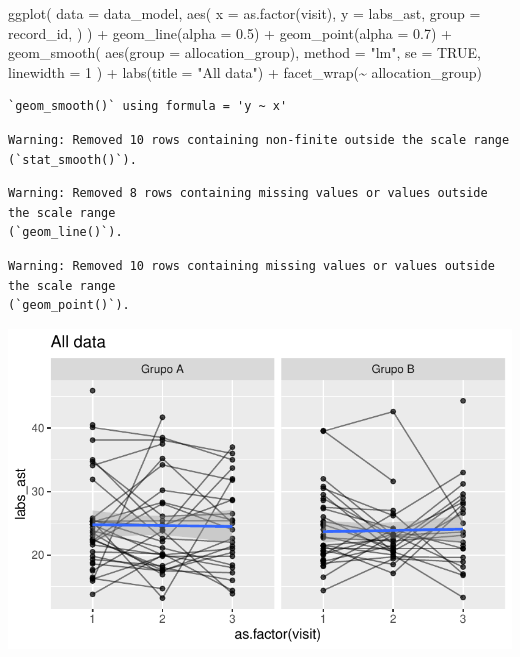 \documentclass[
  letterpaper,
  DIV=11,
  numbers=noendperiod]{scrartcl}
\newenvironment{Shaded}{\begin{snugshade}}{\end{snugshade}}
\newcommand{\AttributeTok}[1]{\textcolor[rgb]{0.40,0.45,0.13}{#1}}
\newcommand{\ConstantTok}[1]{\textcolor[rgb]{0.56,0.35,0.01}{#1}}
\newcommand{\DecValTok}[1]{\textcolor[rgb]{0.68,0.00,0.00}{#1}}
\newcommand{\FloatTok}[1]{\textcolor[rgb]{0.68,0.00,0.00}{#1}}
\newcommand{\FunctionTok}[1]{\textcolor[rgb]{0.28,0.35,0.67}{#1}}
\newcommand{\NormalTok}[1]{\textcolor[rgb]{0.00,0.23,0.31}{#1}}
\newcommand{\SpecialCharTok}[1]{\textcolor[rgb]{0.37,0.37,0.37}{#1}}
\newcommand{\StringTok}[1]{\textcolor[rgb]{0.13,0.47,0.30}{#1}}
\begin{document}
\begin{Shaded}
\begin{Highlighting}[]
\FunctionTok{ggplot}\NormalTok{(}
    \AttributeTok{data =}\NormalTok{ data\_model, }
    \FunctionTok{aes}\NormalTok{(}
        \AttributeTok{x =} \FunctionTok{as.factor}\NormalTok{(visit),}
        \AttributeTok{y =}\NormalTok{ labs\_ast,}
        \AttributeTok{group =}\NormalTok{ record\_id,}
\NormalTok{    )}
\NormalTok{) }\SpecialCharTok{+}
    \FunctionTok{geom\_line}\NormalTok{(}\AttributeTok{alpha =} \FloatTok{0.5}\NormalTok{) }\SpecialCharTok{+}
    \FunctionTok{geom\_point}\NormalTok{(}\AttributeTok{alpha =} \FloatTok{0.7}\NormalTok{) }\SpecialCharTok{+}
    \FunctionTok{geom\_smooth}\NormalTok{(}
        \FunctionTok{aes}\NormalTok{(}\AttributeTok{group =}\NormalTok{ allocation\_group),}
        \AttributeTok{method =} \StringTok{"lm"}\NormalTok{,}
        \AttributeTok{se =} \ConstantTok{TRUE}\NormalTok{,}
        \AttributeTok{linewidth =} \DecValTok{1}
\NormalTok{    ) }\SpecialCharTok{+}
    \FunctionTok{labs}\NormalTok{(}\AttributeTok{title =} \StringTok{"All data"}\NormalTok{) }\SpecialCharTok{+}
    \FunctionTok{facet\_wrap}\NormalTok{(}\SpecialCharTok{\textasciitilde{}}\NormalTok{ allocation\_group)}
\end{Highlighting}
\end{Shaded}

\begin{verbatim}
`geom_smooth()` using formula = 'y ~ x'
\end{verbatim}

\begin{verbatim}
Warning: Removed 10 rows containing non-finite outside the scale range
(`stat_smooth()`).
\end{verbatim}

\begin{verbatim}
Warning: Removed 8 rows containing missing values or values outside the scale range
(`geom_line()`).
\end{verbatim}

\begin{verbatim}
Warning: Removed 10 rows containing missing values or values outside the scale range
(`geom_point()`).
\end{verbatim}

\includegraphics{Outcomes_V1V2V3_files/figure-pdf/labs_ast_6-1.pdf}
\end{document}
